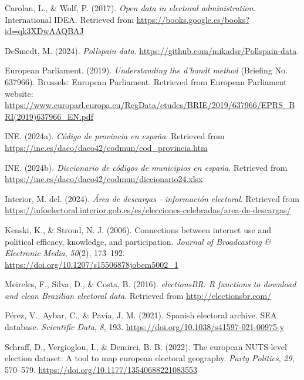 \documentclass[
  letterpaper,
  DIV=11,
  numbers=noendperiod]{scrreprt}
\newlength{\cslhangindent}
\newlength{\cslentryspacingunit} %
\newenvironment{CSLReferences}[2] %
 {%
  \setlength{\parindent}{0pt}
  \ifodd #1
  \let\oldpar\par
  \def\par{\hangindent=\cslhangindent\oldpar}
  \fi
  \setlength{\parskip}{#2\cslentryspacingunit}
 }%
 {}
\begin{document}
\hypertarget{refs}{}
\begin{CSLReferences}{1}{0}
\leavevmode{}%
Carolan, L., \& Wolf, P. (2017). \emph{Open data in electoral
administration}. International IDEA. Retrieved from
\url{https://books.google.es/books?id=qk3XDwAAQBAJ}

\leavevmode{}%
DeSmedt, M. (2024). \emph{Pollspain-data}.
\url{https://github.com/mikadsr/Pollspain-data}.

\leavevmode{}%
European Parliament. (2019). \emph{Understanding the d'hondt method}
(Briefing No. 637966). Brussels: European Parliament. Retrieved from
European Parliament website:
\url{https://www.europarl.europa.eu/RegData/etudes/BRIE/2019/637966/EPRS_BRI(2019)637966_EN.pdf}

\leavevmode{}%
INE. (2024a). \emph{Código de provincia en españa}. Retrieved from
\url{https://ine.es/daco/daco42/codmun/cod_provincia.htm}

\leavevmode{}%
INE. (2024b). \emph{Diccionario de códigos de municipios en españa}.
Retrieved from
\url{https://ine.es/daco/daco42/codmun/diccionario24.xlsx}

\leavevmode{}%
Interior, M. del. (2024). \emph{Área de descargas - información
electoral}. Retrieved from
\url{https://infoelectoral.interior.gob.es/es/elecciones-celebradas/area-de-descargas/}

\leavevmode{}%
Kenski, K., \& Stroud, N. J. (2006). Connections between internet use
and political efficacy, knowledge, and participation. \emph{Journal of
Broadcasting \& Electronic Media}, \emph{50}(2), 173--192.
\url{https://doi.org/10.1207/s15506878jobem5002_1}

\leavevmode{}%
Meireles, F., Silva, D., \& Costa, B. (2016). \emph{{electionsBR}: {R}
functions to download and clean {B}razilian electoral data}. Retrieved
from \url{http://electionsbr.com/}

\leavevmode{}%
Pérez, V., Aybar, C., \& Pavía, J. M. (2021). Spanish electoral archive.
SEA database. \emph{Scientific Data}, \emph{8}, 193.
\url{https://doi.org/10.1038/s41597-021-00975-y}

\leavevmode{}%
Schraff, D., Vergioglou, I., \& Demirci, B. B. (2022). The european
NUTS-level election dataset: A tool to map european electoral geography.
\emph{Party Politics}, \emph{29}, 570--579.
\url{https://doi.org/10.1177/13540688221083553}


\end{CSLReferences}
\end{document}
